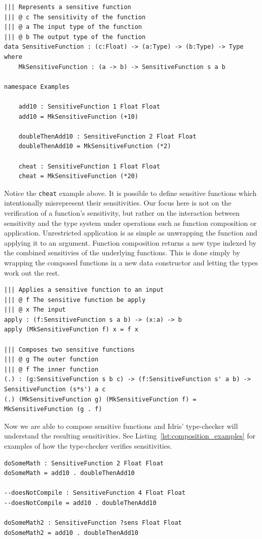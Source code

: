 \documentclass[12pt]{article}
\begin{document}
\begin{lstlisting}
||| Represents a sensitive function
||| @ c The sensitivity of the function
||| @ a The input type of the function
||| @ b The output type of the function
data SensitiveFunction : (c:Float) -> (a:Type) -> (b:Type) -> Type where
    MkSensitiveFunction : (a -> b) -> SensitiveFunction s a b

namespace Examples

    add10 : SensitiveFunction 1 Float Float
    add10 = MkSensitiveFunction (+10)

    doubleThenAdd10 : SensitiveFunction 2 Float Float
    doubleThenAdd10 = MkSensitiveFunction (*2)

    cheat : SensitiveFunction 1 Float Float
    cheat = MkSensitiveFunction (*20)
\end{lstlisting}

Notice the \texttt{cheat} example above.
It is possible to define sensitive functions which intentionally misrepresent their sensitivities.
Our focus here is not on the verification of a function's sensitivity, but rather on the interaction between sensitivity and the type system under operations such as function composition or application.
Unrestricted application is as simple as unwrapping the function and applying it to an argument.
Function composition returns a new type indexed by the combined sensitivies of the underlying functions.
This is done simply by wrapping the composed functions in a new data constructor and letting the types work out the rest.

\begin{lstlisting}
||| Applies a sensitive function to an input
||| @ f The sensitive function be apply
||| @ x The input
apply : (f:SensitiveFunction s a b) -> (x:a) -> b
apply (MkSensitiveFunction f) x = f x

||| Composes two sensitive functions
||| @ g The outer function
||| @ f The inner function
(.) : (g:SensitiveFunction s b c) -> (f:SensitiveFunction s' a b) -> SensitiveFunction (s*s') a c
(.) (MkSensitiveFunction g) (MkSensitiveFunction f) = MkSensitiveFunction (g . f)
\end{lstlisting}

Now we are able to compose sensitive functions and Idris' type-checker will understand the resulting sensitivities.
See Listing~\ref{lst:composition_examples} for examples of how the type-checker verifies sensitivities.

\begin{lstlisting}[caption={Examples of Sensitive Function Composition},label={lst:composition_examples}]
doSomeMath : SensitiveFunction 2 Float Float
doSomeMath = add10 . doubleThenAdd10

--doesNotCompile : SensitiveFunction 4 Float Float
--doesNotCompile = add10 . doubleThenAdd10

doSomeMath2 : SensitiveFunction ?sens Float Float
doSomeMath2 = add10 . doubleThenAdd10
\end{lstlisting}
\end{document}
